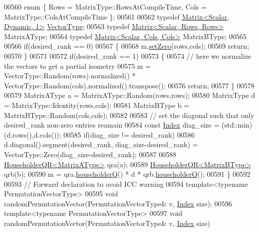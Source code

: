 \begin{DoxyCode}
00560   \textcolor{keyword}{enum} \{ Rows = MatrixType::RowsAtCompileTime, Cols = MatrixType::ColsAtCompileTime \};
00561 
00562   \textcolor{keyword}{typedef} \hyperlink{group___core___module}{Matrix<Scalar, Dynamic, 1>} \hyperlink{struct_vector_type}{VectorType};
00563   \textcolor{keyword}{typedef} \hyperlink{group___core___module_class_eigen_1_1_matrix}{Matrix<Scalar, Rows, Rows>} MatrixAType;
00564   \textcolor{keyword}{typedef} \hyperlink{group___core___module_class_eigen_1_1_matrix}{Matrix<Scalar, Cols, Cols>} MatrixBType;
00565 
00566   \textcolor{keywordflow}{if}(desired\_rank == 0)
00567   \{
00568     m.\hyperlink{class_eigen_1_1_plain_object_base_ac21ad5f989f320e46958b75ac8d9a1da}{setZero}(rows,cols);
00569     \textcolor{keywordflow}{return};
00570   \}
00571 
00572   \textcolor{keywordflow}{if}(desired\_rank == 1)
00573   \{
00574     \textcolor{comment}{// here we normalize the vectors to get a partial isometry}
00575     m = VectorType::Random(rows).normalized() * VectorType::Random(cols).normalized().transpose();
00576     \textcolor{keywordflow}{return};
00577   \}
00578 
00579   MatrixAType a = MatrixAType::Random(rows,rows);
00580   MatrixType d = MatrixType::Identity(rows,cols);
00581   MatrixBType  b = MatrixBType::Random(cols,cols);
00582 
00583   \textcolor{comment}{// set the diagonal such that only desired\_rank non-zero entries reamain}
00584   \textcolor{keyword}{const} \hyperlink{namespace_eigen_a62e77e0933482dafde8fe197d9a2cfde}{Index} diag\_size = (std::min)(d.rows(),d.cols());
00585   \textcolor{keywordflow}{if}(diag\_size != desired\_rank)
00586     d.diagonal().segment(desired\_rank, diag\_size-desired\_rank) = VectorType::Zero(diag\_size-desired\_rank);
00587 
00588   \hyperlink{group___q_r___module_class_eigen_1_1_householder_q_r}{HouseholderQR<MatrixAType>} qra(a);
00589   \hyperlink{group___q_r___module_class_eigen_1_1_householder_q_r}{HouseholderQR<MatrixBType>} qrb(b);
00590   m = qra.\hyperlink{group___q_r___module_affd506c10ef2d25f56e7b1f9f25ff885}{householderQ}() * d * qrb.\hyperlink{group___q_r___module_affd506c10ef2d25f56e7b1f9f25ff885}{householderQ}();
00591 \}
00592 
00593 \textcolor{comment}{// Forward declaration to avoid ICC warning}
00594 \textcolor{keyword}{template}<\textcolor{keyword}{typename} PermutationVectorType>
00595 \textcolor{keywordtype}{void} randomPermutationVector(PermutationVectorType& v, \hyperlink{namespace_eigen_a62e77e0933482dafde8fe197d9a2cfde}{Index} size);
00596 \textcolor{keyword}{template}<\textcolor{keyword}{typename} PermutationVectorType>
00597 \textcolor{keywordtype}{void} randomPermutationVector(PermutationVectorType& v, \hyperlink{namespace_eigen_a62e77e0933482dafde8fe197d9a2cfde}{Index} size)

\end{DoxyCode}
